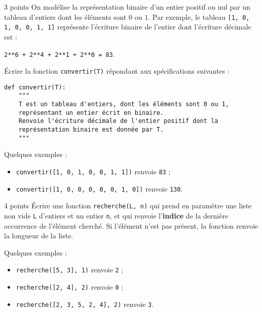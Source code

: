 \documentclass[a4paper,dvipsnames]{article}
\begin{document}
\begin{exercice}{3 points}{}
  On modélise la représentation binaire d'un entier positif ou nul par un tableau d'entiers dont les éléments sont $0$ ou $1$. Par exemple, le tableau \texttt{[1, 0, 1, 0, 0, 1, 1]} représente l'écriture binaire de l'entier dont l'écriture décimale est :

  \begin{center}
    \texttt{2**6 + 2**4 + 2**1 + 2**0 = 83}.    
  \end{center}

  Écrire la fonction \texttt{convertir(T)} répondant aux spécifications suivantes :

  \begin{verbatim}
def convertir(T):
    """
    T est un tableau d'entiers, dont les éléments sont 0 ou 1, 
    représentant un entier écrit en binaire.
    Renvoie l'écriture décimale de l'entier positif dont la 
    représentation binaire est donnée par T.
    """
  \end{verbatim}

  \tcblower

  Quelques exemples :

  \begin{itemize}
    \item \texttt{convertir([1, 0, 1, 0, 0, 1, 1])} renvoie \texttt{83} ;
    \item \texttt{convertir([1, 0, 0, 0, 0, 0, 1, 0])} renvoie \texttt{130}.
  \end{itemize}

\end{exercice}

\medskip

\begin{exercice}{4 points}{}
  Écrire une fonction \texttt{recherche(L, n)} qui prend en paramètre une liste non vide \texttt{L} d'entiers et un entier \texttt{n}, et qui renvoie l'\textbf{indice} de la dernière occurrence de l'élément cherché. Si l'élément n'est pas présent, la fonction renvoie la longueur de la liste.

  \tcblower

  Quelques exemples :

  \begin{itemize}
    \item \texttt{recherche([5, 3], 1)} renvoie \texttt{2} ;
    \item \texttt{recherche([2, 4], 2)} renvoie \texttt{0} ;
    \item \texttt{recherche([2, 3, 5, 2, 4], 2)} renvoie \texttt{3}.
  \end{itemize}
\end{exercice}
\end{document}

